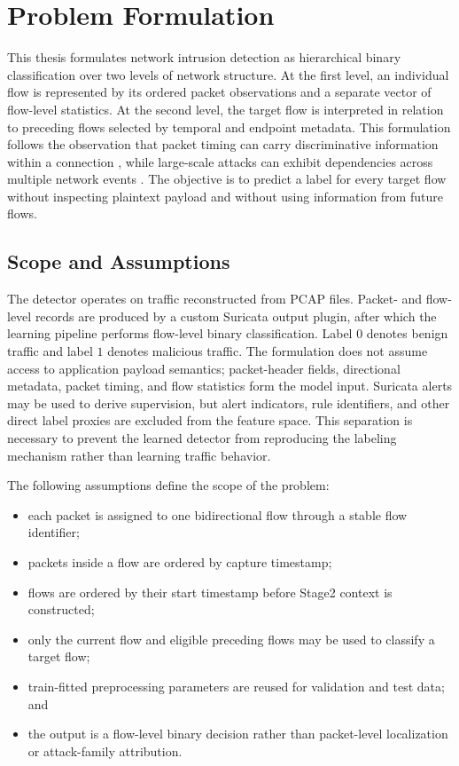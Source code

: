 \section{Problem Formulation}
\label{sec:problem_formulation}

This thesis formulates network intrusion detection as hierarchical binary
classification over two levels of network structure. At the first level, an
individual flow is represented by its ordered packet observations and a
separate vector of flow-level statistics. At the second level, the target flow
is interpreted in relation to preceding flows selected by temporal and endpoint
metadata. This formulation follows the observation that packet timing can carry
discriminative information within a connection \cite{Han2023GTID}, while
large-scale attacks can exhibit dependencies across multiple network events
\cite{LiuPatras2022NetSentry,Manocchio2024FlowTransformer}. The objective is to
predict a label for every target flow without inspecting plaintext payload and
without using information from future flows.

\subsection{Scope and Assumptions}
\label{subsec:pf_scope}

The detector operates on traffic reconstructed from PCAP files. Packet- and
flow-level records are produced by a custom Suricata output plugin, after which
the learning pipeline performs flow-level binary classification. Label $0$
denotes benign traffic and label $1$ denotes malicious traffic. The formulation
does not assume access to application payload semantics; packet-header fields,
directional metadata, packet timing, and flow statistics form the model input.
Suricata alerts may be used to derive supervision, but alert indicators, rule
identifiers, and other direct label proxies are excluded from the feature space.
This separation is necessary to prevent the learned detector from reproducing
the labeling mechanism rather than learning traffic behavior.

The following assumptions define the scope of the problem:

\begin{itemize}
    \item each packet is assigned to one bidirectional flow through a stable
    flow identifier;
    \item packets inside a flow are ordered by capture timestamp;
    \item flows are ordered by their start timestamp before Stage2 context is
    constructed;
    \item only the current flow and eligible preceding flows may be used to
    classify a target flow;
    \item train-fitted preprocessing parameters are reused for validation and
    test data; and
    \item the output is a flow-level binary decision rather than packet-level
    localization or attack-family attribution.
\end{itemize}

